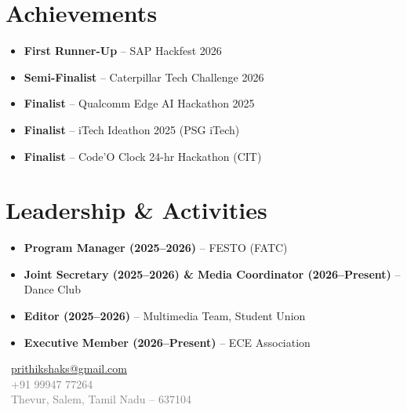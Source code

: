\documentclass[a4paper,10pt]{article}
\begin{document}
\section{Achievements}
\begin{itemize}
\item \textbf{First Runner-Up} -- SAP Hackfest 2026
\item \textbf{Semi-Finalist} -- Caterpillar Tech Challenge 2026
\item \textbf{Finalist} -- Qualcomm Edge AI Hackathon 2025
\item \textbf{Finalist} -- iTech Ideathon 2025 (PSG iTech)
\item \textbf{Finalist} -- Code'O Clock 24-hr Hackathon (CIT)
\end{itemize}

\section{Leadership \& Activities}
\begin{itemize}
\item \textbf{Program Manager (2025--2026)} -- FESTO (FATC)
\item \textbf{Joint Secretary (2025--2026) \& Media Coordinator (2026--Present)} -- Dance Club
\item \textbf{Editor (2025--2026)} -- Multimedia Team, Student Union
\item \textbf{Executive Member (2026--Present)} -- ECE Association
\end{itemize}

\vfill
\begin{flushright}
{\small \textcolor{gray}{
\faEnvelope\ \href{mailto:prithikshaks@gmail.com}{prithikshaks@gmail.com} \\
\faMobile\ +91 99947 77264 \\
\faMapMarker*\ Thevur, Salem, Tamil Nadu -- 637104
}}
\end{flushright}
\end{document}

